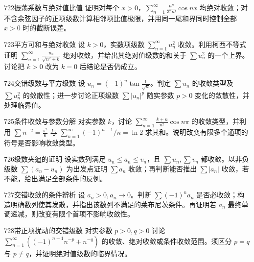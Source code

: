 \begin{exercise}{722}{振荡系数与绝对值比值}
证明对每个 $x>0$，$\sum_{n=1}^{\infty}\frac{n^n}{3^nn!}\cos nx$ 均绝对收敛；对不含余弦因子的正项级数计算相邻项比值极限，并用同一尾和界同时控制全部 $x>0$ 时的截断误差。
\end{exercise}
\begin{exercise}{723}{平方可和与绝对收敛}
设 $k>0$，实数项级数 $\sum_{n=1}^{\infty}u_n^2$ 收敛。利用柯西不等式证明 $\sum_{n=1}^{\infty}\frac{u_n}{\sqrt{n^2+k}}$ 绝对收敛，并给出其绝对值级数的和关于 $\sum u_n^2$ 的一个上界。讨论把 $k>0$ 改为 $k=0$ 后结论是否仍成立。
\end{exercise}
\begin{exercise}{724}{交错级数与平方级数}
设 $u_n=(-1)^n\tan\frac1{\sqrt n}$。判定 $\sum u_n$ 的收敛类型及 $\sum u_n^2$ 的敛散性；进一步讨论正项级数 $\sum |u_n|^p$ 随实参数 $p>0$ 变化的敛散性，并处理临界值。
\end{exercise}
\begin{exercise}{725}{条件收敛与参数分解}
对实参数 $k$，讨论 $\sum_{n=1}^{\infty}\frac{k+n}{n^2}\cos n\pi$ 的收敛类型，并利用 $\sum n^{-2}=\frac{\pi^2}{6}$ 与 $\sum_{n=1}^{\infty}(-1)^{n-1}/n=\ln2$ 求其和。说明改变有限多个通项的符号是否影响收敛类型。
\end{exercise}
\begin{exercise}{726}{级数夹逼的证明}
设实数列满足 $u_n\le a_n\le v_n$，且 $\sum u_n,\sum v_n$ 都收敛。以非负级数 $\sum(a_n-u_n)$ 为出发点证明 $\sum a_n$ 收敛；再判断能否推出 $\sum|a_n|$ 收敛，若不能，给出满足全部条件的反例。
\end{exercise}
\begin{exercise}{727}{交错收敛的条件辨析}
设 $a_n>0,a_n\to0$。判断 $\sum(-1)^na_n$ 是否必收敛；构造明确数列使其发散，并指出该数列不满足的莱布尼茨条件。再证明若 $a_n$ 最终单调递减，则改变有限个首项不影响收敛性。
\end{exercise}
\begin{exercise}{728}{带正项扰动的交错级数}
对实参数 $p>0,q>0$ 讨论 $\sum_{n=1}^{\infty}((-1)^{n-1}n^{-p}+n^{-q})$ 的收敛、绝对收敛或条件收敛范围。须区分 $p=q$ 与 $p\ne q$，并证明绝对值级数的临界情况。
\end{exercise}
